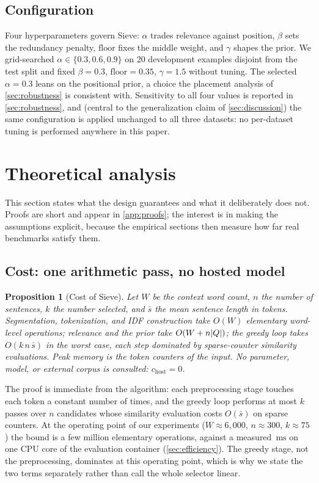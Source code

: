 \documentclass[pdflatex,sn-basic]{sn-jnl}
\DeclarePairedDelimiter\abs{\lvert}{\rvert}
\newtheorem{proposition}{Proposition}
\theoremstyle{remark}
\newcommand{\method}{Sieve}
\newcommand{\ms}{\ensuremath{\mathrm{ms}}}
\begin{document}
\subsection{Configuration}
Four hyperparameters govern \method{}: $\alpha$ trades relevance
against position, $\beta$ sets the redundancy penalty, $\mathrm{floor}$
fixes the middle weight, and $\gamma$ shapes the prior. We
grid-searched $\alpha \in \{0.3, 0.6, 0.9\}$ on 20 development
examples disjoint from the test split and fixed $\beta=0.3$,
$\mathrm{floor}=0.35$, $\gamma=1.5$ without tuning. The selected
$\alpha=0.3$ leans on the positional prior, a choice the placement
analysis of \autoref{sec:robustness} is consistent with. Sensitivity
to all four values is reported in \autoref{sec:robustness}, and
(central to the generalization claim of \autoref{sec:discussion}) the
same configuration is applied unchanged to all three datasets: no
per-dataset tuning is performed anywhere in this paper.

\section{Theoretical analysis}
\label{sec:theory}
This section states what the design guarantees and what it
deliberately does not. Proofs are short and appear in
\autoref{app:proofs}; the interest is in making the assumptions
explicit, because the empirical sections then measure how far real
benchmarks satisfy them.

\subsection{Cost: one arithmetic pass, no hosted model}
\begin{proposition}[Cost of \method{}]
\label{prop:cost}
Let $W$ be the context word count, $n$ the number of sentences, $k$
the number selected, and $\bar{s}$ the mean sentence length in tokens.
Segmentation, tokenization, and IDF construction take $O(W)$
elementary word-level operations; relevance and the prior take
$O(W + n\abs{Q})$; the greedy loop takes $O(k\,n\,\bar{s})$ in the
worst case, each step dominated by sparse-counter similarity
evaluations. Peak memory is the token counters of the input. No
parameter, model, or external corpus is consulted:
$c_{\mathrm{host}} = 0$.
\end{proposition}

The proof is immediate from the algorithm: each preprocessing stage
touches each token a constant number of times, and the greedy loop
performs at most $k$ passes over $n$ candidates whose similarity
evaluation costs $O(\bar{s})$ on sparse counters. At the operating
point of our experiments ($W \approx 6{,}000$, $n \approx 300$,
$k \approx 75$) the bound is a few million elementary operations,
against a measured \TimeSieSixk\,\ms{} on one CPU core of the
evaluation container (\autoref{sec:efficiency}). The greedy stage, not
the preprocessing, dominates at this operating point, which is why we
state the two terms separately rather than call the whole selector
linear.
\end{document}
